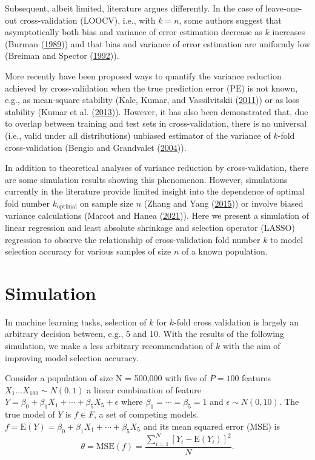 \documentclass[
  12pt,
]{article}
\begin{document}
Subsequent, albeit limited, literature argues differently. In the case
of leave-one-out cross-validation (LOOCV), i.e., with \(k = n\), some
authors suggest that asymptotically both bias and variance of error
estimation decrease as \(k\) increases (Burman
(\protect\hyperlink{ref-Burman1989}{1989})) and that bias and variance
of error estimation are uniformly low (Breiman and Spector
(\protect\hyperlink{ref-Breiman1992}{1992})).

More recently have been proposed ways to quantify the variance reduction
achieved by cross-validation when the true prediction error
(\(\mathrm{PE}\)) is not known, e.g., as mean-square stability (Kale,
Kumar, and Vassilvitskii (\protect\hyperlink{ref-Kale2011}{2011})) or as
loss stability (Kumar et al. (\protect\hyperlink{ref-Kumar2013}{2013})).
However, it has also been demonstrated that, due to overlap between
training and test sets in cross-validation, there is no universal (i.e.,
valid under all distributions) unbiased estimator of the variance of
\(k\)-fold cross-validation (Bengio and Grandvalet
(\protect\hyperlink{ref-Bengio2004}{2004})).

In addition to theoretical analyses of variance reduction by
cross-validation, there are some simulation results showing this
phenomenon. However, simulations currently in the literature provide
limited insight into the dependence of optimal fold number
\(k_\mathrm{optimal}\) on sample size \(n\) (Zhang and Yang
(\protect\hyperlink{ref-Zhang2015}{2015})) or involve biased variance
calculations (Marcot and Hanea
(\protect\hyperlink{ref-Marcot2021}{2021})). Here we present a
simulation of linear regression and least absolute shrinkage and
selection operator (LASSO) regression to observe the relationship of
cross-validation fold number \(k\) to model selection accuracy for
various samples of size \(n\) of a known population.

\hypertarget{simulation}{%
\section{Simulation}\label{simulation}}

In machine learning tasks, selection of \(k\) for \(k\)-fold cross
validation is largely an arbitrary decision between, e.g., 5 and 10.
With the results of the following simulation, we make a less arbitrary
recommendation of \(k\) with the aim of improving model selection
accuracy.

Consider a population of size N = 500,000 with five of \(P = 100\)
features \(X_1...X_{100} \sim N(0, 1)\) a linear combination of feature
\(Y = \beta_0 + \beta_1X_1 + \cdots + \beta_5X_5 + \epsilon\) where
\(\beta_1 = \cdots = \beta_5 = 1\) and \(\epsilon \sim N(0, 10)\). The
true model of \(Y\) is \(f \in F\), a set of competing models.
\(f = \mathrm{E}(Y) = \beta_0 + \beta_1X_1 + \cdots + \beta_5X_5\) and
its mean squared error (\(\mathrm{MSE}\)) is
\[\theta = \mathrm{MSE}(f) = \frac{\sum_{i=1}^{N}[Y_i - \mathrm{E}(Y_i)]^2}{N}.\]
\end{document}
